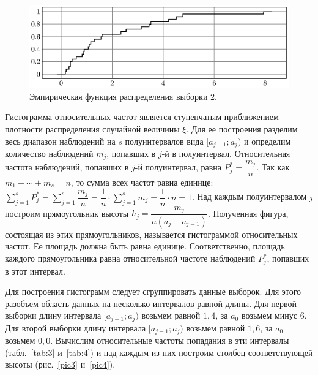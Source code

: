 \begin{figure}[h]
  \includegraphics[scale=1]{images/st.2.eps}
  \caption{Эмпирическая функция распределения выборки 2.}\label{pic2}
\end{figure}

\par
Гистограмма относительных частот является ступенчатым приближением 
плотности распределения случайной величины $\xi$. Для ее построения 
разделим весь диапазон наблюдений на $s$ полуинтервалов вида 
$[a_{j-1}; a_j)$ и определим количество наблюдений $m_j$, попавших в 
$j$-й в полуинтервал. Относительная частота наблюдений, попавших 
в $j$-й полуинтервал, равна $P_j^* = \dfrac{m_j}{n}$. 
Так как $m_1 + \cdots + m_s = n$, то сумма всех частот равна единице: 
$\sum\limits_{j=1}^{s} P_j^* = \sum\limits_{j=1}^{s} \dfrac{m_j}{n} = 
\dfrac{1}{n} \cdot \sum\limits_{j=1}^{s} m_j = \dfrac{1}{n} \cdot n = 1$.
Над каждым полуинтервалом $j$ построим прямоугольник высоты 
$h_j = \dfrac{m_j}{n(a_j-a_{j-1})}$. Полученная фигура, состоящая 
из этих прямоугольников, называется гистограммой относительных частот. 
Ее площадь должна быть равна единице. Соответственно, площадь каждого 
прямоугольника равна относительной частоте наблюдений $P_j^*$, 
попавших в этот интервал.

\par
Для построения гистограмм следует сгруппировать данные выборок. 
Для этого разобъем область данных на несколько интервалов равной длины. 
Для первой выборки длину интервала $[a_{j-1}; a_j)$ возьмем равной 
 $1{,}4$, за $a_0$ возьмем 
минус $6$. 
Для второй выборки длину интервала $[a_{j-1}; a_j)$ возьмем равной 
 $1{,}6$, за $a_0$ возьмем 
 $0{,}0$. 
Вычислим относительные частоты попадания в эти интервалы (табл.~\ref{tab:3} 
и~\ref{tab:4}) и над каждым из них построим столбец соответствующей высоты 
(рис.~\ref{pic3} и~\ref{pic4}).

